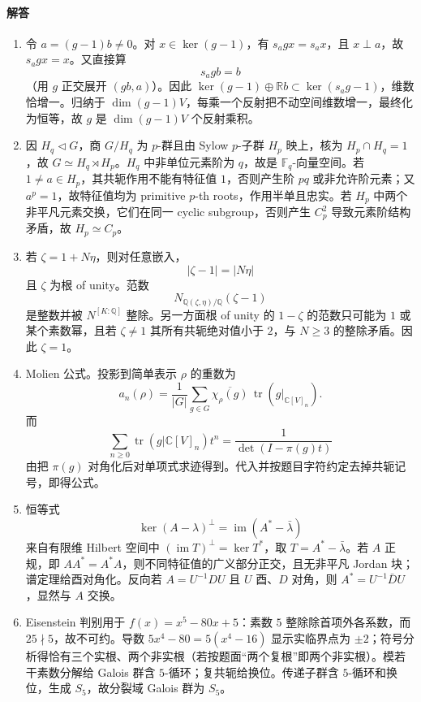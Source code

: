 \documentclass[UTF8,12pt]{ctexart}
\begin{document}
\paragraph{解答}
\begin{enumerate}[label=\textbf{\arabic*.},leftmargin=2.2em]
\item 令 \(a=(g-1)b\ne0\)。对 \(x\in\ker(g-1)\)，有 \(s_agx=s_ax\)，且 \(x\perp a\)，故 \(s_agx=x\)。又直接算
\[
s_ag b=b
\]
（用 \(g\) 正交展开 \((gb,a)\)）。因此 \(\ker(g-1)\oplus\mathbb R b\subset\ker(s_ag-1)\)，维数恰增一。归纳于 \(\dim(g-1)V\)，每乘一个反射把不动空间维数增一，最终化为恒等，故 \(g\) 是 \(\dim(g-1)V\) 个反射乘积。
\item 因 \(H_q\lhd G\)，商 \(G/H_q\) 为 \(p\)-群且由 Sylow \(p\)-子群 \(H_p\) 映上，核为 \(H_p\cap H_q=1\)，故 \(G\simeq H_q\rtimes H_p\)。\(H_q\) 中非单位元素阶为 \(q\)，故是 \(\mathbb F_q\)-向量空间。若 \(1\ne a\in H_p\)，其共轭作用不能有特征值 \(1\)，否则产生阶 \(pq\) 或非允许阶元素；又 \(a^p=1\)，故特征值均为 primitive \(p\)-th roots，作用半单且忠实。若 \(H_p\) 中两个非平凡元素交换，它们在同一 cyclic subgroup，否则产生 \(C_p^2\) 导致元素阶结构矛盾，故 \(H_p\simeq C_p\)。
\item 若 \(\zeta=1+N\eta\)，则对任意嵌入，
\[
|\zeta-1|=|N\eta|
\]
且 \(\zeta\) 为根 of unity。范数
\[
N_{\mathbb Q(\zeta,\eta)/\mathbb Q}(\zeta-1)
\]
是整数并被 \(N^{[K:\mathbb Q]}\) 整除。另一方面根 of unity 的 \(1-\zeta\) 的范数只可能为 \(1\) 或某个素数幂，且若 \(\zeta\ne1\) 其所有共轭绝对值小于 \(2\)，与 \(N\ge3\) 的整除矛盾。因此 \(\zeta=1\)。
\item Molien 公式。投影到简单表示 \(\rho\) 的重数为
\[
a_n(\rho)=\frac1{|G|}\sum_{g\in G}\overline{\chi_\rho(g)}\,\operatorname{tr}(g|_{\mathbb C[V]_n}).
\]
而
\[
\sum_{n\ge0}\operatorname{tr}(g|\mathbb C[V]_n)t^n
=\frac1{\det(I-\pi(g)t)}
\]
由把 \(\pi(g)\) 对角化后对单项式求迹得到。代入并按题目字符约定去掉共轭记号，即得公式。
\item 恒等式
\[
\ker(A-\lambda)^\perp=\operatorname{im}(A^\ast-\bar\lambda)
\]
来自有限维 Hilbert 空间中 \((\operatorname{im}T)^\perp=\ker T^\ast\)，取 \(T=A^\ast-\bar\lambda\)。若 \(A\) 正规，即 \(AA^\ast=A^\ast A\)，则不同特征值的广义部分正交，且无非平凡 Jordan 块；谱定理给酉对角化。反向若 \(A=U^{-1}DU\) 且 \(U\) 酉、\(D\) 对角，则 \(A^\ast=U^{-1}\bar D U\)，显然与 \(A\) 交换。
\item Eisenstein 判别用于 \(f(x)=x^5-80x+5\)：素数 \(5\) 整除除首项外各系数，而 \(25\nmid5\)，故不可约。导数 \(5x^4-80=5(x^4-16)\) 显示实临界点为 \(\pm2\)；符号分析得恰有三个实根、两个非实根（若按题面“两个复根”即两个非实根）。模若干素数分解给 Galois 群含 \(5\)-循环；复共轭给换位。传递子群含 \(5\)-循环和换位，生成 \(S_5\)，故分裂域 Galois 群为 \(S_5\)。
\end{enumerate}
\end{document}
